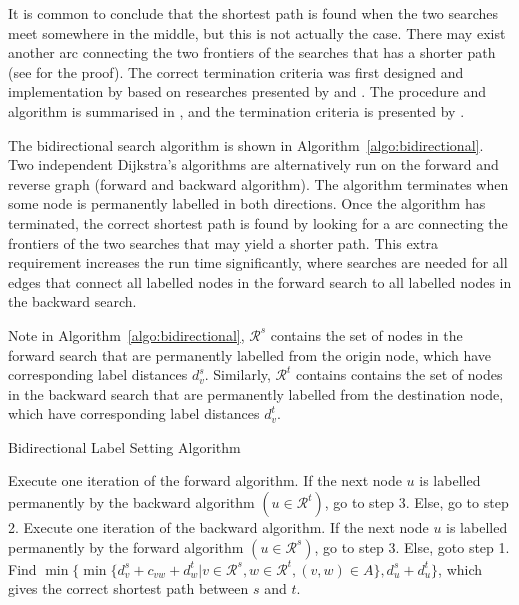 It is common to conclude that the shortest path is found when the two searches meet somewhere in the middle,
but this is not actually the case.
There may exist another arc connecting the two frontiers of the searches that has a shorter path (see \citet{Klunder} for the proof).
The correct termination criteria was first designed and implementation by \citet{Pohl} based on researches presented by \citet{Dantzig, Nicholson} and \citet{Dreyfus}.
The procedure and algorithm is summarised in \citet{Klunder}, and the termination criteria is presented by \citet{Pohl}.

The bidirectional search algorithm is shown in Algorithm~\ref{algo:bidirectional}.
Two independent Dijkstra's algorithms are alternatively run on the forward and reverse graph (forward and backward algorithm).
The algorithm terminates when some node is permanently labelled in both directions.
Once the algorithm has terminated,
the correct shortest path is found by looking for a arc connecting the frontiers of the two searches that may yield a shorter path.
This extra requirement increases the run time significantly, 
where searches are needed for all edges that connect all labelled nodes in the forward search to all labelled nodes in the backward search.

Note in Algorithm~\ref{algo:bidirectional},
$\mathcal{R}^s$ contains the set of nodes in the forward search that are permanently labelled from the origin node,
which have corresponding label distances $d_v^s$.
Similarly, $\mathcal{R}^t$ contains contains the set of nodes in the backward search that are permanently labelled from the destination node,
which have corresponding label distances $d_v^t$.

\begin{algorithm}[H]
    \caption{Bidirectional Label Setting Algorithm }
    \label{algo:bidirectional}
    \begin{algorithmic}[1]
        \State Execute one iteration of the forward algorithm.
        If the next node $u$ is labelled permanently by the 
        backward algorithm $(u\in\mathcal{R}^t)$, go to step 3.
        Else, go to step 2.
        \State Execute one iteration of the backward algorithm.
        If the next node $u$ is labelled permanently by the
        forward algorithm $(u\in\mathcal{R}^s)$, go to step 3.
        Else, goto step 1.
        \State Find $\min\{\min\{d_v^s + c_{vw} + d_w^t | v \in \mathcal{R}^s, w \in \mathcal{R}^t, (v, w) \in A\}, d_u^s + d_u^t\}$, which gives the correct shortest path between $s$ and $t$.
    \EndProcedure
\end{algorithmic}
\end{algorithm}

